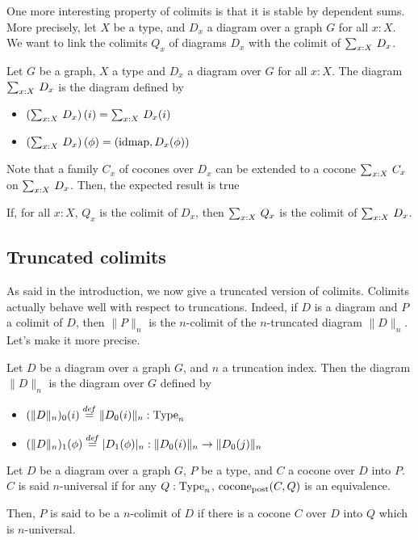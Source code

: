 One more interesting property of colimits is that it is stable by
dependent sums. More precisely, let $X$ be a type, and $D_x$ a diagram
over a graph $G$ for all $x:X$. We want to link the colimits $Q_x$ of
diagrams $D_x$ with the colimit of $\sum_{x:X}\, D_x$.
\begin{defi}
  Let $G$ be a graph, $X$ a type and $D_x$ a diagram over $G$ for all
  $x:X$. The diagram $\sum_{x:X}\, D_x$ is the diagram defined by
  \begin{itemize}
  \item $\left( \sum_{x:X}\, D_x \right)(i) = \sum_{x:X}\, D_x(i)$
  \item $\left( \sum_{x:X}\, D_x \right)(\phi) = (\operatorname{\mathrm{idmap}}, D_x(\phi))$
  \end{itemize}
\end{defi}

Note that a family $C_x$ of cocones over $D_x$ can be extended to a
cocone $\sum_{x:X}\, C_x$ on $\sum_{x:X}\, D_x$. Then, the expected
result is true
\begin{prop}\label{prop:colimit-sigma}
  If, for all $x:X$, $Q_x$ is the colimit of $D_x$, then $\sum_{x:X}\, Q_x$ is the colimit of $\sum_{x:X}\, D_x$.
\end{prop}
 



\subsection{Truncated colimits}
\label{ssec:trunc_colim}

As said in the introduction, we now give a
truncated version of colimits. 
Colimits actually behave well with respect to truncations. Indeed, if $D$ is a
diagram and $P$ a colimit of $D$, then $\|P\|_n$ is the $n$-colimit
of the $n$-truncated diagram $\|D\|_n$. Let's make it more precise.

\begin{defi}
  Let $D$ be a diagram over a graph $G$, and $n$ a truncation index.
  Then the diagram $\|D\|_n$ is the diagram over $G$ defined by
  \begin{itemize}
  \item $(\|D\|_n)_0(i) \overset{de\hspace{-0.2ex}f}{=} \|D_0(i)\|_n:\operatorname{Type}_n$
  \item $(\|D\|_n)_1(\phi) \overset{de\hspace{-0.2ex}f}{=} |D_1(\phi)|_n : \|D_0(i)\|_n \to \|D_0(j)\|_n$
  \end{itemize}
\end{defi}

\begin{defi}
  Let $D$ be a diagram over a graph $G$, $P$ be a type, and $C$ a
  cocone over $D$ into $P$. $C$ is said $n$-universal if for any
  $Q:\operatorname{Type}_n$, $\mathrm{cocone}_{\mathrm{post}}(C,Q)$ is an
  equivalence.

  Then, $P$ is said to be a $n$-colimit of $D$ if there is a cocone
  $C$ over $D$ into $Q$ which is $n$-universal.
\end{defi}

